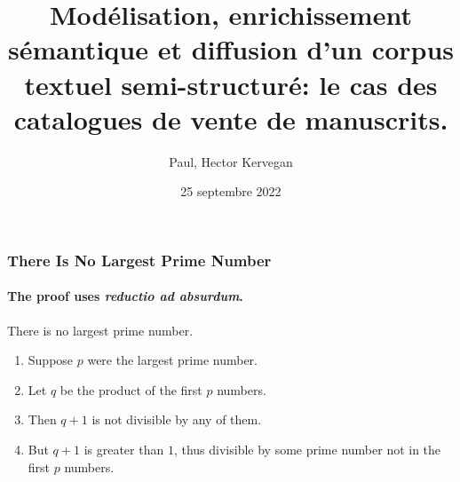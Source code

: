 \documentclass{beamer}
\title{Modélisation, enrichissement sémantique et diffusion d'un corpus textuel semi-structuré: le cas des catalogues de vente de manuscrits.}
\date{25 septembre 2022}
\author[Paul H. Kervegan]{Paul, Hector Kervegan}
\begin{document}
\begin{frame}
	\titlepage
\end{frame}

\begin{frame} 
	\frametitle{There Is No Largest Prime Number} 
	\framesubtitle{The proof uses \textit{reductio ad absurdum}.} 
	\begin{theorem}
		There is no largest prime number. 
	\end{theorem} 
	\begin{enumerate} 
		\item<1-| alert@1> Suppose $p$ were the largest prime number. 
		\item<2-> Let $q$ be the product of the first $p$ numbers. 
		\item<3-> Then $q+1$ is not divisible by any of them. 
		\item<1-> But $q + 1$ is greater than $1$, thus divisible by some prime
		number not in the first $p$ numbers.
	\end{enumerate}
\end{frame}
\end{document}
